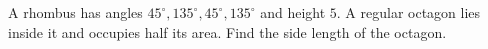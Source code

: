 A rhombus has angles $45^\circ,135^\circ,45^\circ,135^\circ$ and height $5$. A regular octagon lies inside it and occupies half its area. Find the side length of the octagon.
